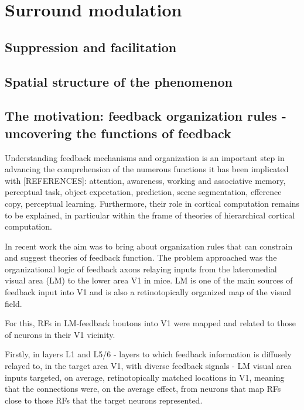 \section{Surround modulation}
\label{sec:sectionb}

\subsection{Suppression and facilitation}
\label{subsec:subasectionE}


\subsection{Spatial structure of the phenomenon}
\label{subsec:subbsectionE}


\subsection{The motivation: feedback organization rules - uncovering the functions of feedback}
\label{subsec:subcsectionE}

 Understanding feedback mechanisms and organization is an important step in advancing the comprehension of the numerous functions it has been implicated with [REFERENCES]\cite{TopDown}: attention, awareness, working and associative memory, perceptual task, object expectation, prediction, scene segmentation, efference copy, perceptual learning.
Furthermore, their role in cortical computation remains to be explained, in particular within the frame of theories of hierarchical cortical computation.

In recent work \cite{Tiago} the aim was to bring about organization rules that can constrain and suggest theories of feedback function. 
The problem approached was the organizational logic of feedback axons relaying inputs from the lateromedial visual area (LM) to the lower area V1 in mice. LM is one of the main sources of feedback input into V1 and is also a retinotopically organized map of the visual field.

For this, RFs in LM-feedback boutons into V1 were mapped and related to those of neurons in their V1 vicinity.

Firstly, in layers L1 and L5/6 - layers to which feedback information is diffusely relayed to, in the target area V1, with diverse feedback signals \cite{9Tiago} - LM visual area inputs targeted, on average, retinotopically matched locations in V1, meaning that the connections were, on the average effect, from neurons that map RFs close to those RFs that the target neurons represented. 

